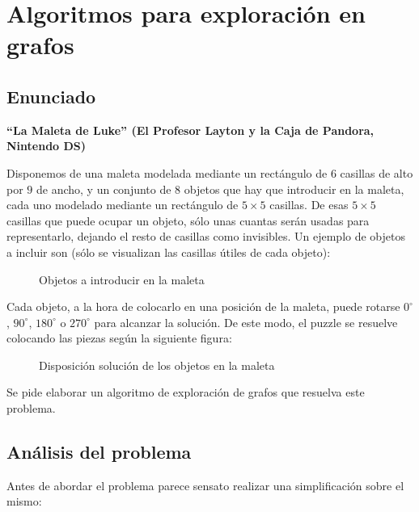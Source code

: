 \chapter{Algoritmos para exploración en grafos}\label{grafos}

\section{Enunciado}\label{grafos-enunciado}

\textbf{“La Maleta de Luke” (El Profesor Layton y la Caja de Pandora, Nintendo DS)}

Disponemos de una maleta modelada mediante un rectángulo de $6$ casillas de alto por $9$ de ancho, y un conjunto de 8 objetos que hay que introducir en la maleta, cada uno modelado mediante un rectángulo de $5\times5$ casillas.
De esas $5\times5$ casillas que puede ocupar un objeto, sólo unas cuantas serán usadas para representarlo, dejando el resto de casillas como invisibles.
Un ejemplo de objetos a incluir son (sólo se visualizan las casillas útiles de cada objeto):

\begin{figure}[h]
\begin{center}

\end{center}
\caption{Objetos a introducir en la maleta}
\end{figure}

Cada objeto, a la hora de colocarlo en una posición de la maleta, puede rotarse $0^{\circ}$, $90^{\circ}$, $180^{\circ}$ o $270^{\circ}$ para alcanzar la solución.
De este modo, el puzzle se resuelve colocando las piezas según la siguiente figura:

\begin{figure}[h]
\begin{center}

\end{center}
\caption{Disposición solución de los objetos en la maleta}
\end{figure}

Se pide elaborar un algoritmo de exploración de grafos que resuelva este problema.

\pagebreak

\section{Análisis del problema}\label{grafos-analisis}

Antes de abordar el problema parece sensato realizar una simplificación sobre el mismo:


